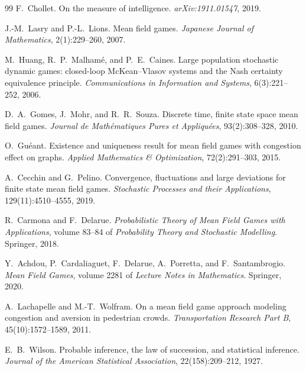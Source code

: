 \documentclass[11pt]{amsart}
\newcommand\1{{\mathds{1}}}
\theoremstyle{definition}
\theoremstyle{remark}
\numberwithin{equation}{section}
\begin{document}
\begin{thebibliography}{99}
F.~Chollet.
\newblock On the measure of intelligence.
\newblock \emph{arXiv:1911.01547}, 2019.

J.-M.~Lasry and P.-L.~Lions.
\newblock Mean field games.
\newblock \emph{Japanese Journal of Mathematics}, 2(1):229--260, 2007.

M.~Huang, R.~P.~Malham\'e, and P.~E.~Caines.
\newblock Large population stochastic dynamic games: closed-loop {McKean--Vlasov} systems and the {Nash} certainty equivalence principle.
\newblock \emph{Communications in Information and Systems}, 6(3):221--252, 2006.

D.~A.~Gomes, J.~Mohr, and R.~R.~Souza.
\newblock Discrete time, finite state space mean field games.
\newblock \emph{Journal de Math\'ematiques Pures et Appliqu\'ees}, 93(2):308--328, 2010.

O.~Gu\'eant.
\newblock Existence and uniqueness result for mean field games with congestion effect on graphs.
\newblock \emph{Applied Mathematics \& Optimization}, 72(2):291--303, 2015.

A.~Cecchin and G.~Pelino.
\newblock Convergence, fluctuations and large deviations for finite state mean field games.
\newblock \emph{Stochastic Processes and their Applications}, 129(11):4510--4555, 2019.

R.~Carmona and F.~Delarue.
\newblock \emph{Probabilistic Theory of Mean Field Games with Applications}, volume 83--84 of \emph{Probability Theory and Stochastic Modelling}.
\newblock Springer, 2018.

Y.~Achdou, P.~Cardaliaguet, F.~Delarue, A.~Porretta, and F.~Santambrogio.
\newblock \emph{Mean Field Games}, volume 2281 of \emph{Lecture Notes in Mathematics}.
\newblock Springer, 2020.

A.~Lachapelle and M.-T.~Wolfram.
\newblock On a mean field game approach modeling congestion and aversion in pedestrian crowds.
\newblock \emph{Transportation Research Part B}, 45(10):1572--1589, 2011.

E.~B.~Wilson.
\newblock Probable inference, the law of succession, and statistical inference.
\newblock \emph{Journal of the American Statistical Association}, 22(158):209--212, 1927.



\end{thebibliography}
\end{document}
